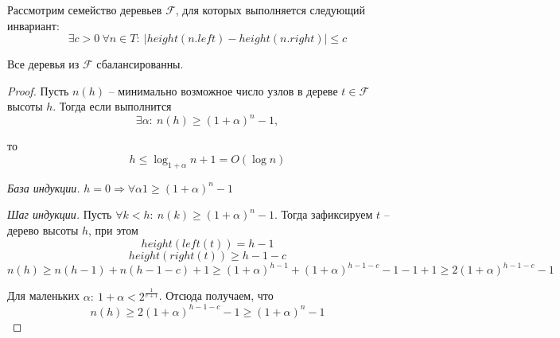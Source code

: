 \documentclass[../main.tex]{subfiles}
\begin{document}
	Рассмотрим семейство деревьев $\mathcal{F}$, для которых выполняется следующий инвариант:
	\[
	\exists c > 0 \ \forall n \in T: \ |height(n.left) - height(n.right)| \leqslant c
	\]
	
	\begin{theorem}
		Все деревья из $\mathcal{F}$ сбалансированны.
	\end{theorem}
	\begin{proof}
		Пусть $n(h)$ -- минимально возможное число узлов в дереве $t \in \mathcal{F}$ высоты $h$. Тогда если выполнится
		\[
		\exists \alpha : \ n(h) \geqslant (1 + \alpha)^n - 1,
		\] 
		
		то $$h \leqslant \log_{1+\alpha} n + 1 = O(\log n)$$
		
		\textit{База индукции.} $h = 0 \Rightarrow \forall \alpha 1 \geqslant (1 + \alpha)^n - 1$

		\textit{Шаг индукции.} Пусть $\forall k < h: \ n(k) \geqslant (1 + \alpha)^n - 1$. Тогда зафиксируем $t$ -- дерево высоты $h$, при этом
		\[
		height(left(t)) = h - 1
		\]
		\[
		height(right(t)) \geqslant h - 1 - c
		\]
		\[
		n(h)
		\geqslant
		n(h - 1) + n(h - 1 - c) + 1 
		\geqslant
		(1 + \alpha)^{h - 1} + (1 + \alpha)^{h - 1 - c} - 1 - 1 + 1 
		\geqslant 
		2(1 + \alpha)^{h - 1 - c} - 1
		\]
		
		Для маленьких $\displaystyle \alpha: \ 1 + \alpha < 2^{\frac{1}{c + 1}}$. Отсюда получаем, что 
		\[
		n(h) \geqslant
		2(1 + \alpha)^{h-1-c} - 1 \geqslant (1 + \alpha)^n - 1
		\]
	\end{proof}

	\pagebreak
	
	
	
	
	
	
	
	
\end{document}

